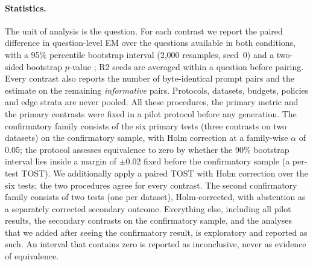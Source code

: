 \paragraph{Statistics.}
The unit of analysis is the question. For each contrast we report the paired difference in question-level EM over the questions available in both conditions, with a 95\% percentile bootstrap interval (2{,}000 resamples, seed~0) and a two-sided bootstrap $p$-value \citep{efron1993bootstrap}; R2 seeds are averaged within a question before pairing. Every contrast also reports the number of byte-identical prompt pairs and the estimate on the remaining \emph{informative} pairs. Protocols, datasets, budgets, policies and edge strata are never pooled. All these procedures, the primary metric and the primary contrasts were fixed in a pilot protocol before any generation. The confirmatory family consists of the six primary tests (three contrasts on two datasets) on the confirmatory sample, with Holm correction \citep{holm1979} at a family-wise $\alpha$ of 0.05; the protocol assesses equivalence to zero by whether the 90\% bootstrap interval lies inside a margin of $\pm0.02$ fixed before the confirmatory sample (a per-test TOST). We additionally apply a paired TOST with Holm correction over the six tests; the two procedures agree for every contrast. The second confirmatory family consists of two tests (one per dataset), Holm-corrected, with abstention as a separately corrected secondary outcome. Everything else, including all pilot results, the secondary contrasts on the confirmatory sample, and the analyses that we added after seeing the confirmatory result, is exploratory and reported as such. An interval that contains zero is reported as inconclusive, never as evidence of equivalence.
